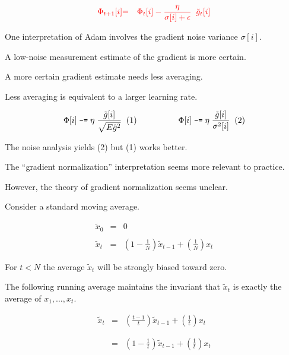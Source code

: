 {

\begin{eqnarray*}
{\color{red} \Phi_{t+1}[i]} & {\color{red} =} & {\color{red} \Phi_t[i] - \frac{\eta}{\sigma[i] + \epsilon}\;\; \tilde{g}_t[i]}
\end{eqnarray*}

\vfill
One interpretation of Adam involves the gradient noise variance $\sigma[i]$.

\vfill
A low-noise measurement estimate of the gradient is more certain.

\vfill
A more certain gradient estimate needs less averaging.

\vfill
Less averaging is equivalent to a larger learning rate.


{\color{red} $$\Phi[i] \;\mbox{\tt -=} \; \eta\;\frac{\tilde{g}[i]}{\sqrt{E \hat{g}^2}}\;\;(1)\hspace{5em}\Phi[i] \;\mbox{\tt -=} \; \eta\;\frac{\tilde{g}[i]}{\sigma^2[i]}\;\;(2)$$}

\vfill
The noise analysis yields (2) but (1) works better.

\vfill
The ``gradient normalization'' interpretation seems more relevant to practice.

\vfill
However, the theory of gradient normalization seems unclear.


Consider a standard moving average.

\begin{eqnarray*}
\tilde{x}_0 & = & 0 \\
\\
\tilde{x}_t & = & \left(1-\frac{1}{N}\right)\tilde{x}_{t-1} + \left(\frac{1}{N}\right)x_t
\end{eqnarray*}

\vfill
For $t < N$ the average $\tilde{x}_t$ will be strongly biased toward zero.


The following running average maintains the invariant that $\tilde{x}_t$ is exactly the average of $x_1,\ldots,x_t$.

\begin{eqnarray*}
\tilde{x}_t & = & \left(\frac{t-1}{t}\right)\tilde{x}_{t-1} + \left(\frac{1}{t}\right)x_t \\
\\
\\
& = & \left(1-\frac{1}{t}\right)\tilde{x}_{t-1} + \left(\frac{1}{t}\right)x_t
\end{eqnarray*}

}
